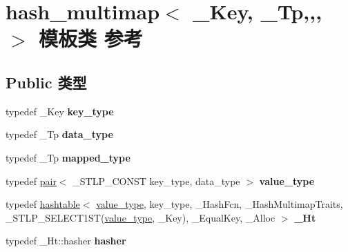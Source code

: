 \hypertarget{classhash__multimap}{}\section{hash\+\_\+multimap$<$ \+\_\+\+Key, \+\_\+\+Tp,,, $>$ 模板类 参考}
\label{classhash__multimap}
\subsection*{Public 类型}
\begin{DoxyCompactItemize}
\item 
\mbox{\label{classhash__multimap_a5cae953b5f3d294368548fa7bb880d02}} 
typedef \+\_\+\+Key {\bfseries key\+\_\+type}
\item 
\mbox{\label{classhash__multimap_ab5e4ed4f8821f2b4a90fca9a48b8cd9a}} 
typedef \+\_\+\+Tp {\bfseries data\+\_\+type}
\item 
\mbox{\label{classhash__multimap_adee85250cad70ed73991044e3eb5dee8}} 
typedef \+\_\+\+Tp {\bfseries mapped\+\_\+type}
\item 
\mbox{\label{classhash__multimap_a50254a5031e552e853e1d7ee0bae3bf8}} 
typedef \hyperlink{structpair}{pair}$<$ \+\_\+\+S\+T\+L\+P\+\_\+\+C\+O\+N\+ST key\+\_\+type, data\+\_\+type $>$ {\bfseries value\+\_\+type}
\item 
\mbox{\label{classhash__multimap_aca0ce3cba8a885e6b07812bbfadbb35c}} 
typedef \hyperlink{classhashtable}{hashtable}$<$ \hyperlink{structpair}{value\+\_\+type}, key\+\_\+type, \+\_\+\+Hash\+Fcn, \+\_\+\+Hash\+Multimap\+Traits, \+\_\+\+S\+T\+L\+P\+\_\+\+S\+E\+L\+E\+C\+T1\+ST(\hyperlink{structpair}{value\+\_\+type}, \+\_\+\+Key), \+\_\+\+Equal\+Key, \+\_\+\+Alloc $>$ {\bfseries \+\_\+\+Ht}
\item 
\mbox{\label{classhash__multimap_a23692f51abb27766e5bebfa877d01b77}} 
typedef \+\_\+\+Ht\+::hasher {\bfseries hasher}
\item 
\mbox{\label{classhash__multimap_afbf5bbe7e5a86c3945af3817f360226f}} 

\end{DoxyCompactItemize}
